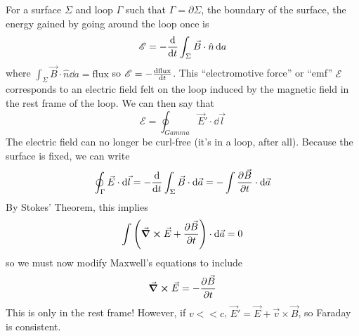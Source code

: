 \documentclass[a4paper,twoside,master.tex]{subfiles}
\begin{document}
For a surface $ \Sigma $ and loop $ \Gamma $ such that $ \Gamma = \partial\Sigma $, the boundary of the surface, the energy gained by going around the loop once is
\begin{equation}
    \mathscr{E} = - \dv{t} \int_{\Sigma} \vec{B} \cdot \hat{n} \dd{a}
\end{equation}
where $ \int_{\Sigma} \vec{B} \cdot \hat{n} \dd{a} = \text{flux} $ so $ \mathscr{E} = - \dv{\text{flux}}{t} $.
This ``electromotive force'' or ``emf'' $ \mathscr{E} $ corresponds to an electric field felt on the loop induced by the magnetic field in the rest frame of the loop. We can then say that
\begin{equation}
    \mathscr{E} = \oint_{Gamma} \vec{E}' \cdot \dd{\vec{l}}
\end{equation}
The electric field can no longer be curl-free (it's in a loop, after all). Because the surface is fixed, we can write
\begin{equation}
    \oint_{\Gamma} \vec{E} \cdot \dd{ \vec{l}} = - \dv{t} \int_{\Sigma} \vec{B} \cdot \dd{ \vec{a}} = - \int \pdv{ \vec{B}}{t} \cdot \dd{ \vec{a}}
\end{equation}
By Stokes' Theorem, this implies
\begin{equation}
    \int \left( \curl{ \vec{E}} + \pdv{ \vec{B}}{t} \right) \cdot \dd{ \vec{a}} = 0
\end{equation}
so we must now modify Maxwell's equations to include
\begin{equation}
    \curl{ \vec{E}} = - \pdv{ \vec{B}}{t}
\end{equation}
This is only in the rest frame! However, if $ v << c $, $ \vec{E}' = \vec{E} + \vec{v} \times \vec{B} $, so Faraday is consistent.
\end{document}

